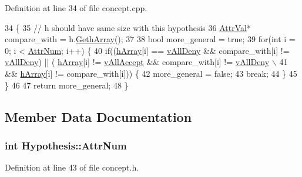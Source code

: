 Definition at line 34 of file concept.\-cpp.


\begin{DoxyCode}
34                                                       \{
35     \textcolor{comment}{// h should have same size with this hypothesis}
36     \hyperlink{concept_8h_a9680d29b8d997e4adbf99481b65e897d}{AttrVal}* compare\_with = h.\hyperlink{class_hypothesis_a9f7689475f40bcd554b01ad7670aec8a}{GethArray}();
37     
38     \textcolor{keywordtype}{bool} more\_general = \textcolor{keyword}{true};
39     \textcolor{keywordflow}{for}(\textcolor{keywordtype}{int} i = 0; i < \hyperlink{class_hypothesis_acb02bcc74b95846666f713143be4e550}{AttrNum}; i++) \{
40     \textcolor{keywordflow}{if}((\hyperlink{class_hypothesis_a2b381d29eb7a6101eda6fcd3a2e5380b}{hArray}[i] == \hyperlink{concept_8h_a9680d29b8d997e4adbf99481b65e897da11f228b43fc46c19132632500bcaf314}{vAllDeny} && compare\_with[i] != \hyperlink{concept_8h_a9680d29b8d997e4adbf99481b65e897da11f228b43fc46c19132632500bcaf314}{vAllDeny}) || (
      \hyperlink{class_hypothesis_a2b381d29eb7a6101eda6fcd3a2e5380b}{hArray}[i] != \hyperlink{concept_8h_a9680d29b8d997e4adbf99481b65e897da6e098ab4d58e23ef1a840e0a338ef96f}{vAllAccept} && compare\_with[i] != \hyperlink{concept_8h_a9680d29b8d997e4adbf99481b65e897da11f228b43fc46c19132632500bcaf314}{vAllDeny} \(\backslash\)
41         && \hyperlink{class_hypothesis_a2b381d29eb7a6101eda6fcd3a2e5380b}{hArray}[i] != compare\_with[i])) \{
42         more\_general = \textcolor{keyword}{false};
43         \textcolor{keywordflow}{break};
44     \}
45     \}
46 
47     \textcolor{keywordflow}{return} more\_general;
48 \}
\end{DoxyCode}


\subsection{Member Data Documentation}
\hypertarget{class_hypothesis_acb02bcc74b95846666f713143be4e550}{
\subsubsection[{Attr\-Num}]{\setlength{\rightskip}{0pt plus 5cm}int Hypothesis\-::\-Attr\-Num\hspace{0.3cm}{\ttfamily [private]}}}\label{class_hypothesis_acb02bcc74b95846666f713143be4e550}


Definition at line 43 of file concept.\-h.

